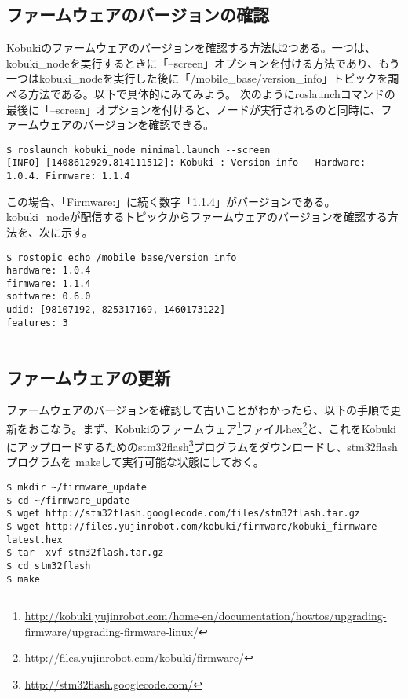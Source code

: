 \subsection{ファームウェアのバージョンの確認}

Kobukiのファームウェアのバージョンを確認する方法は2つある。一つは、kobuki\_nodeを実行するときに「--screen」オプションを付ける方法であり、もう一つはkobuki\_nodeを実行した後に「/mobile\_base/version\_info」トピックを調べる方法である。以下で具体的にみてみよう。
次のようにroslaunchコマンドの最後に「--screen」オプションを付けると、ノードが実行されるのと同時に、ファームウェアのバージョンを確認できる。

\begin{lstlisting}[language=ROS]
$ roslaunch kobuki_node minimal.launch --screen
[INFO] [1408612929.814111512]: Kobuki : Version info - Hardware: 1.0.4. Firmware: 1.1.4
\end{lstlisting}

この場合、「Firmware:」に続く数字「1.1.4」がバージョンである。
kobuki\_nodeが配信するトピックからファームウェアのバージョンを確認する方法を、次に示す。

\begin{lstlisting}[language=ROS]
$ rostopic echo /mobile_base/version_info
hardware: 1.0.4
firmware: 1.1.4
software: 0.6.0
udid: [98107192, 825317169, 1460173122]
features: 3
---
\end{lstlisting}

\subsection{ファームウェアの更新}

ファームウェアのバージョンを確認して古いことがわかったら、以下の手順で更新をおこなう。まず、Kobukiのファームウェア\footnote{\url{http://kobuki.yujinrobot.com/home-en/documentation/howtos/upgrading-firmware/upgrading-firmware-linux/}}ファイルhex\footnote{\url{http://files.yujinrobot.com/kobuki/firmware/}}と、これをKobukiにアップロードするためのstm32flash\footnote{\url{http://stm32flash.googlecode.com/}}プログラムをダウンロードし、stm32flashプログラムを makeして実行可能な状態にしておく。

\begin{lstlisting}[language=ROS]
$ mkdir ~/firmware_update
$ cd ~/firmware_update
$ wget http://stm32flash.googlecode.com/files/stm32flash.tar.gz
$ wget http://files.yujinrobot.com/kobuki/firmware/kobuki_firmware-latest.hex
$ tar -xvf stm32flash.tar.gz
$ cd stm32flash
$ make
\end{lstlisting}

